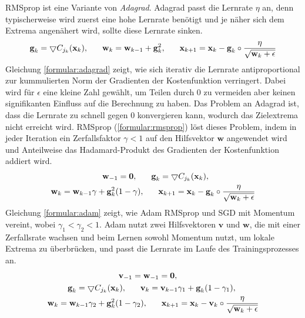 RMSprop ist eine Variante von \textit{Adagrad}.
Adagrad passt die Lernrate $\eta$ an, denn typischerweise wird zuerst eine hohe Lernrate benötigt und je näher sich dem Extrema angenähert wird,
sollte diese Lernrate sinken.
\begin{align}
    \label{formular:adagrad}
    \textbf{g}_k = \bigtriangledown C_{j_k}(\textbf{x}_k), \hspace{0.6cm}
    \textbf{w}_k = \textbf{w}_{k-1} + \textbf{g}_k^2, \hspace{0.6cm}
    \textbf{x}_{k+1} = \textbf{x}_k - \textbf{g}_k \circ \frac{\eta}{\sqrt{\textbf{w}_k + \epsilon}}
\end{align}
Gleichung \ref{formular:adagrad} zeigt, wie sich iterativ die Lernrate antiproportional
zur kummulierten Norm der Gradienten der Kostenfunktion verringert.
Dabei wird für $\epsilon$ eine kleine Zahl gewählt, um Teilen durch 0 zu vermeiden aber keinen signifikanten Einfluss auf die Berechnung zu haben.
\newline
\newline
Das Problem an Adagrad ist, dass die Lernrate zu schnell gegen 0 konvergieren kann, wodurch das Zielextrema nicht erreicht wird.
RMSprop (\ref{formular:rmsprop}) löst dieses Problem, indem in jeder Iteration ein Zerfallsfaktor $\gamma < 1$ auf den Hilfsvektor $\textbf{w}$ angewendet wird
und Anteilweise das Hadamard-Produkt des Gradienten der Kostenfunktion addiert wird.
\begin{align}
    \label{formular:rmsprop}
    \textbf{w}_{-1} = \textbf{0}, \hspace{0.6cm}
    \textbf{g}_k = \bigtriangledown C_{j_k}(\textbf{x}_k), \hspace{2cm} \nonumber\\
    \textbf{w}_k = \textbf{w}_{k-1}\gamma + \textbf{g}_k^2 (1-\gamma), \hspace{0.6cm}
    \textbf{x}_{k+1} = \textbf{x}_k - \textbf{g}_k \circ \frac{\eta}{\sqrt{\textbf{w}_k + \epsilon}}
\end{align}
Gleichung \ref{formular:adam} zeigt, wie Adam RMSprop und SGD mit Momentum vereint, wobei $\gamma_1 < \gamma_2 < 1$.
Adam nutzt zwei Hilfsvektoren $\textbf{v}$ und $\textbf{w}$, die mit einer Zerfallsrate wachsen und beim Lernen
sowohl Momentum nutzt, um lokale Extrema zu überbrücken, und passt die Lernrate im Laufe des Trainingsprozesses an.
\begin{align}
    \label{formular:adam}
    \textbf{v}_{-1} = \textbf{w}_{-1} = \textbf{0}, \hspace{3.5cm} \nonumber\\
    \textbf{g}_k = \bigtriangledown C_{j_k}(\textbf{x}_k), \hspace{0.6cm}
    \textbf{v}_k = \textbf{v}_{k-1}\gamma_1 + \textbf{g}_k (1-\gamma_1), \hspace{1cm} \nonumber\\
    \textbf{w}_k = \textbf{w}_{k-1}\gamma_2 + \textbf{g}_k^2 (1-\gamma_2), \hspace{0.6cm}
    \textbf{x}_{k+1} = \textbf{x}_k - \textbf{v}_k \circ \frac{\eta}{\sqrt{\textbf{w}_k + \epsilon}}
\end{align}

